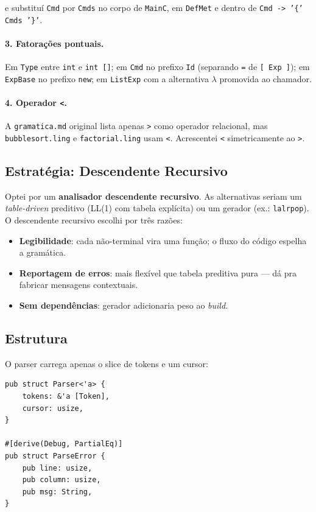 \documentclass[12pt,a4paper]{article}
\begin{document}
\noindent e substituí \texttt{Cmd} por \texttt{Cmds} no corpo de
\texttt{MainC}, em \texttt{DefMet} e dentro de \texttt{Cmd -> '\{' Cmds '\}'}.

\paragraph{3. Fatorações pontuais.} Em \texttt{Type} entre
\texttt{int} e \texttt{int []}; em \texttt{Cmd} no prefixo
\texttt{Id} (separando \texttt{=} de \texttt{[ Exp ]}); em
\texttt{ExpBase} no prefixo \texttt{new}; em \texttt{ListExp} com a
alternativa $\lambda$ promovida ao chamador.

\paragraph{4. Operador \texttt{<}.} A \texttt{gramatica.md} original
lista apenas \verb|>| como operador relacional, mas
\texttt{bubblesort.ling} e \texttt{factorial.ling} usam \verb|<|.
Acrescentei \verb|<| simetricamente ao \verb|>|.

\subsection{Estratégia: Descendente Recursivo}

Optei por um \textbf{analisador descendente recursivo}. As alternativas
seriam um \emph{table-driven} preditivo (LL(1) com tabela explícita) ou
um gerador (ex.: \texttt{lalrpop}). O descendente recursivo escolhi
por três razões:

\begin{itemize}
  \item \textbf{Legibilidade}: cada não-terminal vira uma função;
    o fluxo do código espelha a gramática.
  \item \textbf{Reportagem de erros}: mais flexível que tabela
    preditiva pura --- dá pra fabricar mensagens contextuais.
  \item \textbf{Sem dependências}: gerador adicionaria peso ao
    \emph{build}.
\end{itemize}

\subsection{Estrutura}

O parser carrega apenas o slice de tokens e um cursor:

\begin{lstlisting}[caption={Estrutura do parser}]
pub struct Parser<'a> {
    tokens: &'a [Token],
    cursor: usize,
}

#[derive(Debug, PartialEq)]
pub struct ParseError {
    pub line: usize,
    pub column: usize,
    pub msg: String,
}
\end{lstlisting}
\end{document}
